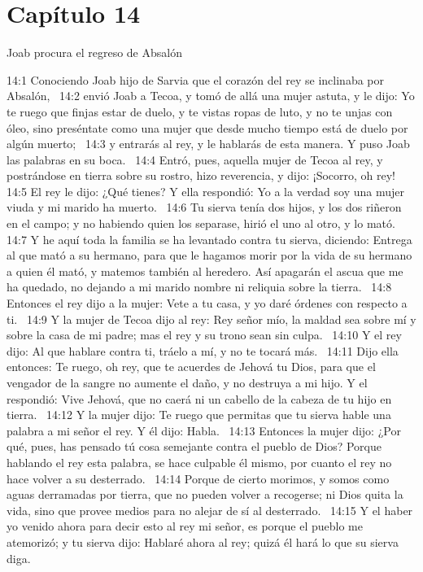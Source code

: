 \section*{Capítulo 14 }
Joab procura el regreso de Absalón  

14:1 Conociendo Joab hijo de Sarvia que el corazón del rey se inclinaba por Absalón,  
14:2 envió Joab a Tecoa, y tomó de allá una mujer astuta, y le dijo: Yo te ruego que finjas estar de duelo, y te vistas ropas de luto, y no te unjas con óleo, sino preséntate como una mujer que desde mucho tiempo está de duelo por algún muerto;  
14:3 y entrarás al rey, y le hablarás de esta manera. Y puso Joab las palabras en su boca.  
14:4 Entró, pues, aquella mujer de Tecoa al rey, y postrándose en tierra sobre su rostro, hizo reverencia, y dijo: ¡Socorro, oh rey!  
14:5 El rey le dijo: ¿Qué tienes? Y ella respondió: Yo a la verdad soy una mujer viuda y mi marido ha muerto.  
14:6 Tu sierva tenía dos hijos, y los dos riñeron en el campo; y no habiendo quien los separase, hirió el uno al otro, y lo mató. 
14:7 Y he aquí toda la familia se ha levantado contra tu sierva, diciendo: Entrega al que mató a su hermano, para que le hagamos morir por la vida de su hermano a quien él mató, y matemos también al heredero. Así apagarán el ascua que me ha quedado, no dejando a mi marido nombre ni reliquia sobre la tierra.  
14:8 Entonces el rey dijo a la mujer: Vete a tu casa, y yo daré órdenes con respecto a ti.  
14:9 Y la mujer de Tecoa dijo al rey: Rey señor mío, la maldad sea sobre mí y sobre la casa de mi padre; mas el rey y su trono sean sin culpa.  
14:10 Y el rey dijo: Al que hablare contra ti, tráelo a mí, y no te tocará más.  
14:11 Dijo ella entonces: Te ruego, oh rey, que te acuerdes de Jehová tu Dios, para que el vengador de la sangre no aumente el daño, y no destruya a mi hijo. Y el respondió: Vive Jehová, que no caerá ni un cabello de la cabeza de tu hijo en tierra.  
14:12 Y la mujer dijo: Te ruego que permitas que tu sierva hable una palabra a mi señor el rey. Y él dijo: Habla.  
14:13 Entonces la mujer dijo: ¿Por qué, pues, has pensado tú cosa semejante contra el pueblo de Dios? Porque hablando el rey esta palabra, se hace culpable él mismo, por cuanto el rey no hace volver a su desterrado.  
14:14 Porque de cierto morimos, y somos como aguas derramadas por tierra, que no pueden volver a recogerse; ni Dios quita la vida, sino que provee medios para no alejar de sí al desterrado.  
14:15 Y el haber yo venido ahora para decir esto al rey mi señor, es porque el pueblo me atemorizó; y tu sierva dijo: Hablaré ahora al rey; quizá él hará lo que su sierva diga.  
